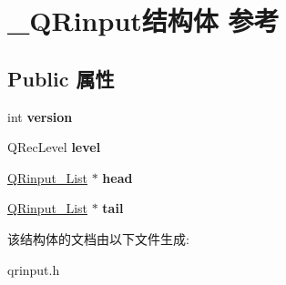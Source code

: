 \hypertarget{struct___q_rinput}{\section{\-\_\-\-Q\-Rinput结构体 参考}
\label{struct___q_rinput}
}
\subsection*{Public 属性}
\begin{DoxyCompactItemize}
\item 
\hypertarget{struct___q_rinput_a4f6567d11fd6301d4efd0daa27481676}{int {\bfseries version}}\label{struct___q_rinput_a4f6567d11fd6301d4efd0daa27481676}

\item 
\hypertarget{struct___q_rinput_a7fe3d6d3b406da8f59726fbc2349ba35}{Q\-Rec\-Level {\bfseries level}}\label{struct___q_rinput_a7fe3d6d3b406da8f59726fbc2349ba35}

\item 
\hypertarget{struct___q_rinput_a481ad94ce05c3a74804f1633f8a09cf8}{\hyperlink{struct___q_rinput___list}{Q\-Rinput\-\_\-\-List} $\ast$ {\bfseries head}}\label{struct___q_rinput_a481ad94ce05c3a74804f1633f8a09cf8}

\item 
\hypertarget{struct___q_rinput_a9809b55019593773843ffafdba75f6f0}{\hyperlink{struct___q_rinput___list}{Q\-Rinput\-\_\-\-List} $\ast$ {\bfseries tail}}\label{struct___q_rinput_a9809b55019593773843ffafdba75f6f0}

\end{DoxyCompactItemize}


该结构体的文档由以下文件生成\-:\begin{DoxyCompactItemize}
\item 
qrinput.\-h\end{DoxyCompactItemize}
